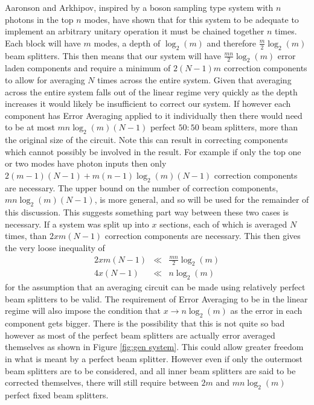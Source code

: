 \documentclass[aps,pra,twocolumn,superscriptaddress,numerical,floatfix]{revtex4-1}
\begin{document}
Aaronson and Arkhipov, inspired by a boson sampling type system with $n$ photons in the top $n$ modes, have shown \cite{Boson} that for this system to be adequate to implement an arbitrary unitary operation it must be chained together $n$ times. Each block will have $m$ modes, a depth of $\log_{2}\left(m\right)$ and therefore $\frac{m}{2}\log_{2}\left(m\right)$ beam splitters. This then means that our system will have $\frac{mn}{2}\log_{2}\left(m\right)$ error laden components and require a minimum of $2\left(N-1\right)m$ correction components to allow for averaging $N$ times across the entire system. Given that averaging across the entire system falls out of the linear regime very quickly as the depth increases it would likely be insufficient to correct our system. If however each component has Error Averaging applied to it individually then there would need to be at most $mn\log_{2}\left(m\right)\left(N-1\right)$ perfect $50:50$ beam splitters, more than the original size of the circuit. Note this can result in correcting components which cannot possibly be involved in the result. For example if only the top one or two modes have photon inputs then only $2\left(m-1\right)\left(N-1\right)+m\left(n-1\right)\log_{2}\left(m\right)\left(N-1\right)$ correction components are necessary. The upper bound on the number of correction components, $mn\log_{2}\left(m\right)\left(N-1\right)$, is more general, and so will be used for the remainder of this discussion. This suggests something part way between these two cases is necessary. If a system was split up into $x$ sections, each of which is averaged $N$ times, than $2xm\left(N-1\right)$ correction components are necessary. This then gives the very loose inequality of
\begin{eqnarray}
2xm\left(N-1\right) & \ll & \frac{mn}{2}\log_{2}\left(m\right)\nonumber \\
4x\left(N-1\right) & \ll & n\log_{2}\left(m\right)\label{eq:veryLooseInequality}
\end{eqnarray}
for the assumption that an averaging circuit can be made using relatively perfect beam splitters to be valid. The requirement of Error Averaging to be in the linear regime will also impose the condition that $x\rightarrow n\log_{2}\left(m\right)$ as the error in each component gets bigger. There is the possibility that this is not quite so bad however as most of the perfect beam splitters are actually error averaged themselves as shown in Figure \ref{fig:gen system}. This could allow greater freedom in what is meant by a perfect beam splitter. However even if only the outermost beam splitters are to be considered, and all inner beam splitters are said to be corrected themselves, there will still require between $2m$ and $mn\log_{2}\left(m\right)$ perfect fixed beam splitters.
\end{document}
